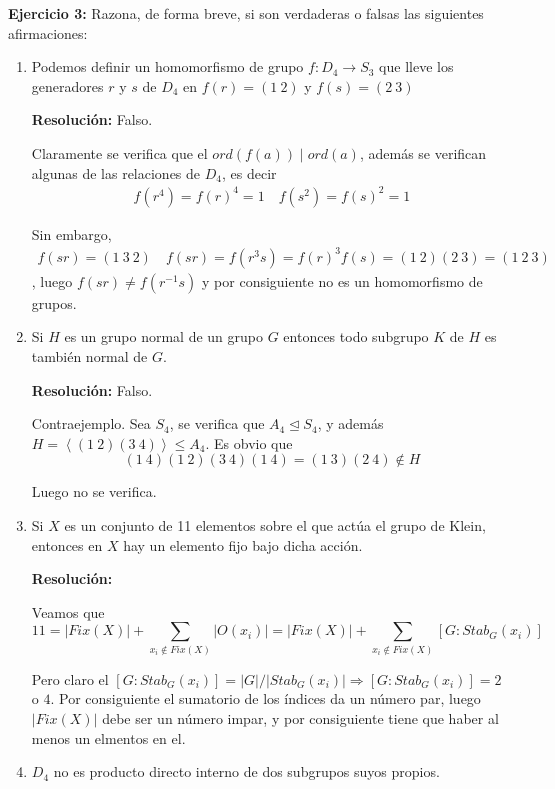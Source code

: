 \documentclass{article}
\begin{document}
\textbf{Ejercicio 3:} Razona, de forma breve, si son verdaderas o falsas las siguientes afirmaciones:
\begin{enumerate}
\item Podemos definir un homomorfismo de grupo $f:D_4\longrightarrow S_3$ que lleve los generadores $r$ y $s$ de $D_4$ en $f(r)=(1\:2)$ y $f(s)=(2\:3)$

\textbf{Resolución:} Falso.

Claramente se verifica que el $ord(f(a))\mid ord(a)$, además se verifican algunas de las relaciones de $D_4$, es decir
\begin{gather*}
f(r^4)=f(r)^4=1\quad f(s^2)=f(s)^2=1
\end{gather*}

Sin embargo, 
\begin{gather*}
f(sr)=(1\:3\:2)\quad f(sr)=f(r^3s)=f(r)^3f(s)=(1\:2)(2\:3)=(1\:2\:3)
\end{gather*}
, luego $f(sr)\neq f(r^{-1}s)$ y por consiguiente no es un homomorfismo de grupos.

\item Si $H$ es un grupo normal de un grupo $G$ entonces todo subgrupo $K$ de $H$ es también normal de $G$.

\textbf{Resolución:} Falso.

Contraejemplo. Sea $S_4$, se verifica que $A_4\unlhd S_4$, y además $H=\left\langle (1\:2)(3\:4)\right\rangle \leq A_4$. Es obvio que
\begin{equation*}
(1\:4)(1\:2)(3\:4)(1\:4)=(1\:3)(2\:4)\notin H
\end{equation*}

Luego no se verifica.

\item Si $X$ es un conjunto de 11 elementos sobre el que actúa el grupo de Klein, entonces en $X$ hay un elemento fijo bajo dicha acción. 

\textbf{Resolución:} 

Veamos que 
\[11=|Fix(X)|+\sum_{x_i\notin Fix(X)} |O(x_i)|=|Fix(X)|+\sum_{x_i\notin Fix(X)} \left[G:Stab_G(x_i)\right]\]

Pero claro el $\left[G:Stab_G(x_i)\right]=|G|/|Stab_G(x_i)|\Rightarrow \left[G:Stab_G(x_i)\right]=2$ o $4$. Por consiguiente el sumatorio de los índices da un número par, luego $|Fix(X)|$ debe ser un número impar, y por consiguiente tiene que haber al menos un elmentos en el.

\item $D_4$ no es producto directo interno de dos subgrupos suyos propios.


\end{enumerate}
\end{document}
